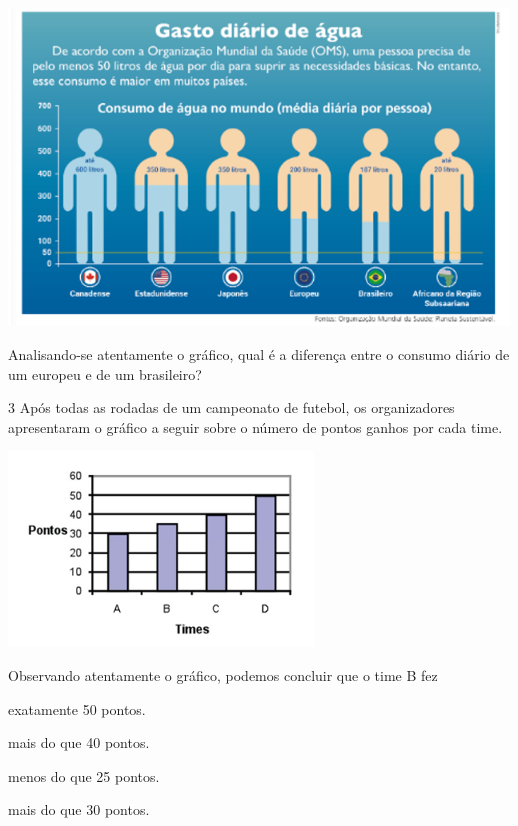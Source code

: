 \begin{mdframed}[linewidth=2pt,linecolor=salmao,roundcorner=2pt]
\begin{escolha}
{\includegraphics[width=5.22545in,height=3.31695in]{media/image95.png}

Analisando-se atentamente o gráfico, qual é a diferença entre o
consumo diário de um europeu e de um brasileiro?

\begin{mdframed}[linewidth=2pt,linecolor=salmao,roundcorner=2pt]
\vspace{2cm}
\end{mdframed}

\num{3} Após todas as rodadas de um campeonato de futebol, os organizadores
apresentaram o gráfico a seguir sobre o número de pontos ganhos por cada
time.

\includegraphics[width=3.19194in,height=2.04184in]{media/image96.png}

Observando atentamente o gráfico, podemos concluir que o time B fez

\begin{escolha}
\item
  exatamente 50 pontos.
\item
  mais do que 40 pontos.
\item
  menos do que 25 pontos.
\item
  mais do que 30 pontos.
\end{escolha}

}
\end{escolha}
\end{mdframed}
